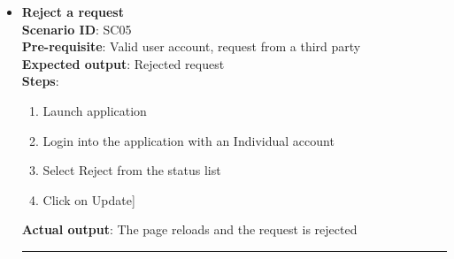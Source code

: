 \documentclass[a4paper, hidelinks, 12pt]{report}
\begin{document}
\begin{itemize}
		\item{\textbf{Reject a request}} \\
		\textbf{Scenario ID}: SC05 \\
		\textbf{Pre-requisite}: Valid user account,  request from a third party \\
		\textbf{Expected output}: Rejected request\\
		\textbf{Steps}:
		\begin{enumerate}
			\item{Launch application}
			\item{Login into the application with an Individual account}
			\item{Select Reject from the status list}
			\item{Click on Update}]
		\end{enumerate}
		\textbf{Actual output}: The page reloads and the request is rejected\\
		\rule{\linewidth}{0.4pt}
\end{itemize}
\end{document}
